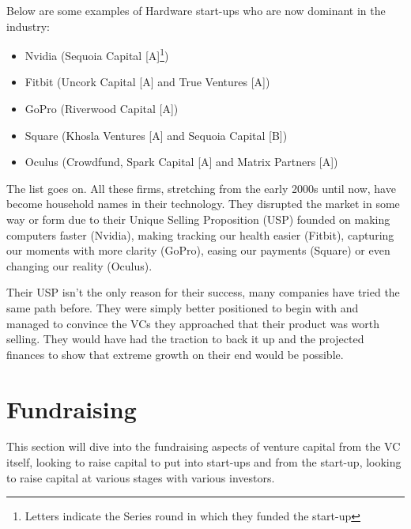 \documentclass[a4paper]{article}
\begin{document}
{\vspace{5pt}
\noindent Below are some examples of Hardware start-ups who are now dominant in the industry:
\begin{itemize}
	\item Nvidia (Sequoia Capital [A]\footnote{Letters indicate the Series round in which they funded the start-up})
	\item Fitbit (Uncork Capital [A] and True Ventures [A])
	\item GoPro (Riverwood Capital [A])
	\item Square (Khosla Ventures [A] and Sequoia Capital [B])
	\item Oculus (Crowdfund, Spark Capital [A] and Matrix Partners [A])
\end{itemize}
\vspace{5pt}
The list goes on. All these firms, stretching from the early 2000s until now, have become household names in their technology. They disrupted the market in some way or form due to their Unique Selling Proposition (USP) founded on making computers faster (Nvidia), making tracking our health easier (Fitbit), capturing our moments with more clarity (GoPro), easing our payments (Square) or even changing our reality (Oculus).

\vspace{5pt}
\noindent Their USP isn't the only reason for their success, many companies have tried the same path before. They were simply better positioned to begin with and managed to convince the VCs they approached that their product was worth selling. They would have had the traction to back it up and the projected finances to show that extreme growth on their end would be possible.

\newpage
\section{Fundraising}
This section will dive into the fundraising aspects of venture capital from the VC itself, looking to raise capital to put into start-ups and from the start-up, looking to raise capital at various stages with various investors.



\newpage
}
\end{document}
